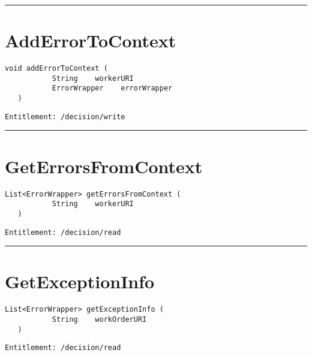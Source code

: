 \rule{12cm}{2pt}
\section{AddErrorToContext}
\label{Api:AddErrorToContext}
\begin{lstlisting}[style=nonumbers]
   void addErrorToContext (
           String    workerURI
           ErrorWrapper    errorWrapper
   )
\end{lstlisting}
\begin{Verbatim}[formatcom=\color{Maroon}]
  Entitlement: /decision/write
\end{Verbatim}



\rule{12cm}{2pt}
\section{GetErrorsFromContext}
\label{Api:GetErrorsFromContext}
\begin{lstlisting}[style=nonumbers]
   List<ErrorWrapper> getErrorsFromContext (
           String    workerURI
   )
\end{lstlisting}
\begin{Verbatim}[formatcom=\color{Maroon}]
  Entitlement: /decision/read
\end{Verbatim}



\rule{12cm}{2pt}
\section{GetExceptionInfo}
\label{Api:GetExceptionInfo}
\begin{lstlisting}[style=nonumbers]
   List<ErrorWrapper> getExceptionInfo (
           String    workOrderURI
   )
\end{lstlisting}
\begin{Verbatim}[formatcom=\color{Maroon}]
  Entitlement: /decision/read
\end{Verbatim}



